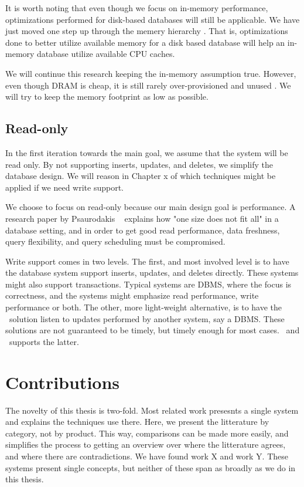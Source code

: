 It is worth noting that even though we focus on in-memory performance, optimizations performed for disk-based databases will still be applicable. We have just moved one step up through the memery hierarchy \cite{Boncz2002-yj}. That is, optimizations done to better utilize available memory for a disk based database will help an in-memory database utilize available CPU caches. 

We will continue this research keeping the in-memory assumption true. However, even though DRAM is cheap, it is still rarely over-provisioned and unused \cite{Barber2014-ey}. We will try to keep the memory footprint as low as possible.

\subsection{Read-only}
\label{sub:Read-only}
In the first iteration towards the main goal, we assume that the system will be read only. By not supporting inserts, updates, and deletes, we simplify the database design. We will reason in Chapter x of which techniques might be applied if we need write support.

We choose to focus on read-only because our main design goal is performance. A research paper by Psaurodakis \ea~\cite{Psaroudakis2014-ma} explains how "one size does not fit all" in a database setting, and in order to get good read performance, data freshness, query flexibility, and query scheduling must be compromised.

Write support comes in two levels. The first, and most involved level is to have the database system support inserts, updates, and deletes directly. These systems might also support transactions. Typical systems are DBMS, where the focus is correctness, and the systems might emphasize read performance, write performance or both. The other, more light-weight alternative, is to have the \bd~solution listen to updates performed by another system, say a DBMS. These solutions are not guaranteed to be timely, but timely enough for most cases. \qlikview~and \tableau~supports the latter.

%


\section{Contributions}
\label{sec:Contributions}
The novelty of this thesis is two-fold. Most related work presesnts a single system and explains the techniques use there. Here, we present the litterature by category, not by product. This way, comparisons can be made more easily, and simplifies the process to getting an overview over where the litterature agrees, and where there are contradictions. We have found work X and work Y. These systems present single concepts, but neither of these span as broadly as we do in this thesis.

